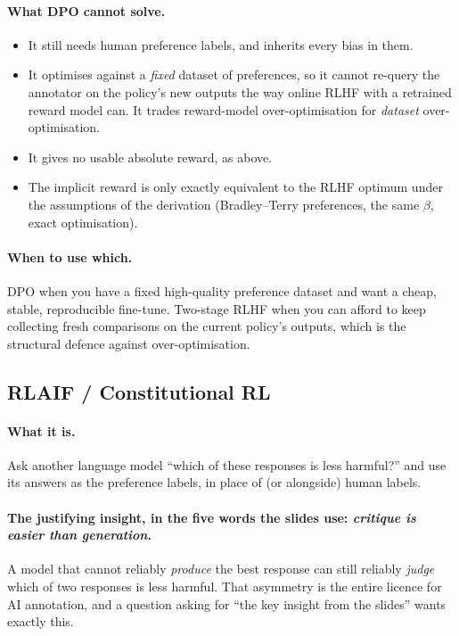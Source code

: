 \documentclass[11pt,a4paper]{article}
\begin{document}
\paragraph{What DPO cannot solve.}
\begin{itemize}
\item It still needs human preference labels, and inherits every bias in them.
\item It optimises against a \emph{fixed} dataset of preferences, so it cannot
re-query the annotator on the policy's new outputs the way online RLHF with a
retrained reward model can. It trades reward-model over-optimisation for
\emph{dataset} over-optimisation.
\item It gives no usable absolute reward, as above.
\item The implicit reward is only exactly equivalent to the RLHF optimum under
the assumptions of the derivation (Bradley--Terry preferences, the same
$\beta$, exact optimisation).
\end{itemize}

\paragraph{When to use which.} DPO when you have a fixed high-quality
preference dataset and want a cheap, stable, reproducible fine-tune. Two-stage
RLHF when you can afford to keep collecting fresh comparisons on the current
policy's outputs, which is the structural defence against over-optimisation.

\subsection{RLAIF / Constitutional RL}

\paragraph{What it is.} Ask another language model ``which of these responses
is less harmful?'' and use its answers as the preference labels, in place of
(or alongside) human labels.

\paragraph{The justifying insight, in the five words the slides use:
\emph{critique is easier than generation}.} A model that cannot reliably
\emph{produce} the best response can still reliably \emph{judge} which of two
responses is less harmful. That asymmetry is the entire licence for AI
annotation, and a question asking for ``the key insight from the slides''
wants exactly this.
\end{document}
